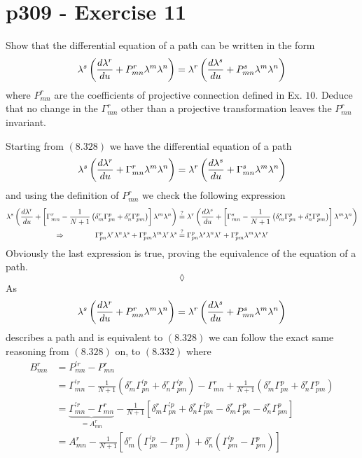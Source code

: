\section{p309 - Exercise 11}
\begin{tcolorbox}
Show that the differential equation of a path can be written in the form
$$\lambda^s\left(\dv{\lambda^r}{u}+P^r_{mn}\lambda^m\lambda^n\right) = \lambda^r\left(\dv{\lambda^s}{u}+P^s_{mn}\lambda^m\lambda^n\right)$$
where $P^r_{mn}$ are the coefficients of projective connection defined in Ex. $10$. Deduce that no change in the $\Gamma^r_{mn}$ other than a projective transformation leaves the $P^r_{mn}$ invariant.
\end{tcolorbox}
Starting from $\mathbf{(8.328)}$ we have the differential equation of a path
\begin{align*}
\lambda^s\left(\dv{\lambda^r}{u}+\Gamma^r_{mn}\lambda^m\lambda^n\right) = \lambda^r\left(\dv{\lambda^s}{u}+\Gamma^s_{mn}\lambda^m\lambda^n\right)
\end{align*}
and using the definition of $P^r_{mn}$ we check the following expression
\begin{align*}
\lambda^s\left(\dv{\lambda^r}{u}+\left[\Gamma^r_{mn}-\frac{1}{N+1}\left(\delta^r_m \Gamma^p_{pn}+  \delta^r_n \Gamma^p_{pm} \right)\right]\lambda^m\lambda^n\right) &\overset{\mathrm{?}}{=} \lambda^r\left(\dv{\lambda^s}{u}+\left[\Gamma^s_{mn}-\frac{1}{N+1}\left(\delta^s_m \Gamma^p_{pn}+  \delta^s_n \Gamma^p_{pm} \right)\right]\lambda^m\lambda^n\right)\\
\Rightarrow \quad\quad\quad\quad  \Gamma^p_{pn}\lambda^r\lambda^n\lambda^s+  \Gamma^p_{pm} \lambda^m\lambda^r\lambda^s &\overset{\mathrm{?}}{=} \Gamma^p_{pn}\lambda^s\lambda^n\lambda^r+   \Gamma^p_{pm}\lambda^m\lambda^s\lambda^r
\end{align*}
Obviously the last expression is true, proving the equivalence of the equation of a path.
$$\lozenge$$
As $$\lambda^s\left(\dv{\lambda^r}{u}+P^r_{mn}\lambda^m\lambda^n\right) = \lambda^r\left(\dv{\lambda^s}{u}+P^s_{mn}\lambda^m\lambda^n\right)$$ describes a path and is equivalent to $\mathbf{(8.328)}$ we can follow the exact same reasoning from $\mathbf{(8.328)}$ on, to $\mathbf{(8.332)}$ where 
\begin{align*}
B^r_{mn} &=P^{'r}_{mn}-P^{r}_{mn}\\
&=\Gamma ^{'r}_{mn}-\frac{1}{N+1}\left(\delta^r_m \Gamma^{'p}_{pn}+  \delta^r_n \Gamma^{'p}_{pm} \right)-\Gamma ^{r}_{mn}+\frac{1}{N+1}\left(\delta^r_m \Gamma^p_{pn}+  \delta^r_n \Gamma^p_{pm} \right)\\
&=\underbrace{\Gamma ^{'r}_{mn}-\Gamma ^{r}_{mn}}_{= A^r_{mn}}-\frac{1}{N+1}\left[\delta^r_m \Gamma^{'p}_{pn}+  \delta^r_n \Gamma^{'p}_{pm} -\delta^r_m \Gamma^p_{pn}-  \delta^r_n \Gamma^p_{pm} \right]\\
&=A^r_{mn}-\frac{1}{N+1}\left[\delta^r_m\left( \Gamma^{'p}_{pn}-\Gamma^p_{pn}\right) +  \delta^r_n \left(\Gamma^{'p}_{pm} -   \Gamma^p_{pm} \right)\right]
\end{align*}

